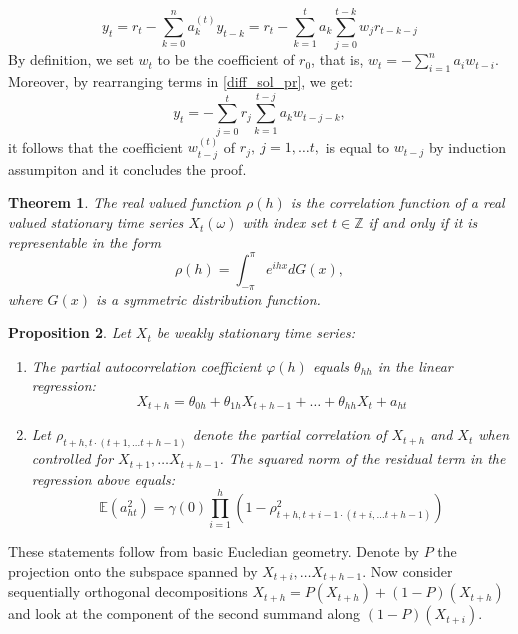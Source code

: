 \documentclass[12pt]{article}
\newtheorem{theorem}{Theorem}[section]
\newtheorem{proposition}[theorem]{Proposition}
\theoremstyle{definition}
\theoremstyle{remark}
\numberwithin{equation}{section}
\newcommand{\ZZ}{\mathbb{Z}}
\newcommand{\EE}{\mathbb{E}}
\begin{document}
\begin{equation}\label{diff_sol_pr}
	y_t = r_t - \sum_{k = 0}^{n}a_k^{(t)}y_{t-k}=r_t - \sum_{k = 1}^{t}a_k\sum_{j = 0}^{t - k} w_jr_{t - k - j}
\end{equation}
By definition, we set $w_t$ to be the coefficient of $r_0$, that is,  $w_t = - \sum_{i = 1}^n a_iw_{t-i}$. Moreover, by rearranging terms in \ref{diff_sol_pr}, we get:
\begin{equation*}
	y_t = -\sum_{j = 0}^t r_j \sum_{k = 1}^{t-j}{a_k w_{t-j-k}},
\end{equation*}
it follows that the coefficient $w_{t-j}^{(t)}$ of $r_j, \ j = 1, \ldots t,$ is equal to $w_{t-j}$ by induction assumpiton and it concludes the proof.



\begin{theorem}
	The real valued function $\rho(h)$ is the correlation function of a real valued stationary time series $X_t(\omega)$ with index set $t\in\ZZ$ if and only if it is representable in the form
\begin{equation*}
	\rho(h) = \int_{-\pi}^\pi e^{ihx}dG(x),
\end{equation*}
	where $G(x)$ is a symmetric distribution function.
\end{theorem}


\begin{proposition}\label{pac_properties} Let $X_t$ be weakly stationary time series:
	\begin{enumerate}
		\item The partial autocorrelation coefficient $\varphi(h)$ equals $\theta_{hh}$ in the linear regression:
		\begin{equation*}
			X_{t+h} = \theta_{0h} + \theta_{1h}X_{t+h-1} + \ldots + \theta_{hh}X_t + a_{ht}
		\end{equation*}
		\item Let $\rho_{t+h,t\cdot(t+1, \ldots t+h-1)}$ denote the partial correlation of $X_{t+h}$ and $X_t$ when controlled for $X_{t+1}, \ldots X_{t+h-1}$. The squared norm of the residual term in the regression above equals:
		\begin{equation*}
			\EE(a_{ht}^2) = \gamma(0)\prod_{i = 1}^{h}(1-\rho_{t+h, t+i-1\cdot(t+i, \ldots t+h-1)}^2)
		\end{equation*}
	\end{enumerate}
\end{proposition}
\proof These statements follow from basic Eucledian geometry. Denote by $P$ the projection onto the subspace spanned by $X_{t+i}, \ldots X_{t+h-1}$. Now consider sequentially orthogonal decompositions $X_{t+h} = P(X_{t+h}) + (1 - P)(X_{t+h})$ and look at the component of the second summand along $(1 - P)(X_{t+i})$.
\end{document}

